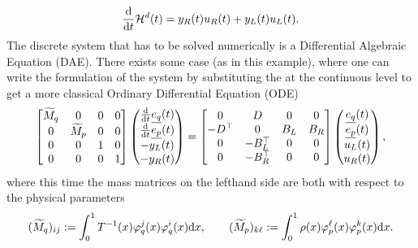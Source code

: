 \documentclass[letterpaper,10pt,english]{sphinxmanual}
\begin{document}
\begin{equation*}
\begin{split}\frac{\rm d}{{\rm d}t} \mathcal{H}^d(t) = y_R(t) u_R(t) + y_L(t) u_L(t).\end{split}
\end{equation*}
\sphinxAtStartPar
{} The discrete system that has to be solved numerically is a
Differential Algebraic Equation (DAE). There exists some case (as in
this example), where one can write the  formulation of the
system by substituting the  at the continuous
level to get a more classical Ordinary Differential Equation (ODE)
\begin{equation*}
\begin{split}\begin{bmatrix}
\widetilde{M}_q & 0 & 0 & 0 \\
0 & \widetilde{M}_p & 0 & 0 \\
0 & 0 & 1 & 0 \\
0 & 0 & 0 & 1
\end{bmatrix}
\begin{pmatrix}
\frac{\rm d}{{\rm d}t} \underline{e_q}(t) \\
\frac{\rm d}{{\rm d}t} \underline{e_p}(t) \\
- y_L(t) \\
- y_R(t)
\end{pmatrix}
=
\begin{bmatrix}
0 & D & 0 & 0 \\
-D^\top & 0 & B_L & B_R \\
0 & -B_L^\top & 0 & 0 \\
0 & -B_R^\top & 0 & 0
\end{bmatrix}
\begin{pmatrix}
\underline{e_q}(t) \\
\underline{e_p}(t) \\
u_L(t) \\
u_R(t)
\end{pmatrix},\end{split}
\end{equation*}
\sphinxAtStartPar
where this time the mass matrices on the left\sphinxhyphen{}hand side are both
 with respect to the physical parameters
\begin{equation*}
\begin{split}(\widetilde{M}_q)_{ij} := \int_0^1 T^{-1}(x) \varphi_q^j(x) \varphi_q^i(x) {\rm d}x,
\qquad
(\widetilde{M}_p)_{k\ell} := \int_0^1 \rho(x) \varphi_p^\ell(x) \varphi_p^k(x) {\rm d}x.\end{split}
\end{equation*}
\end{document}
